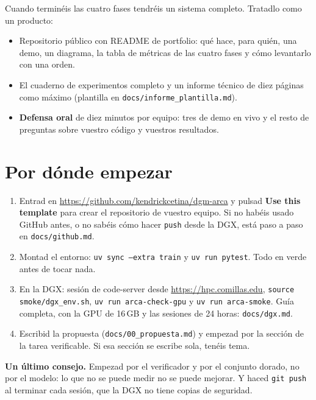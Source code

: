 \documentclass[11pt,a4paper]{article}
\newcommand{\code}[1]{{\small\texttt{#1}}}
\newcommand{\file}[1]{{\small\texttt{\textcolor{arcablue}{#1}}}}
\begin{document}
Cuando terminéis las cuatro fases tendréis un sistema completo. Tratadlo como un producto:

\begin{itemize}
  \item Repositorio público con README de portfolio: qué hace, para quién, una demo, un
  diagrama, la tabla de métricas de las cuatro fases y cómo levantarlo con una orden.
  \item El cuaderno de experimentos completo y un informe técnico de diez páginas como máximo
  (plantilla en \file{docs/informe\_plantilla.md}).
  \item \textbf{Defensa oral} de diez minutos por equipo: tres de demo en vivo y el resto de
  preguntas sobre vuestro código y vuestros resultados.
\end{itemize}

\section{Por dónde empezar}

\begin{enumerate}
  \item Entrad en \url{https://github.com/kendrickcetina/dgm-arca} y pulsad
  \textbf{Use this template} para crear el repositorio de vuestro equipo. Si no habéis usado
  GitHub antes, o no sabéis cómo hacer \code{push} desde la DGX, está paso a paso en
  \file{docs/github.md}.
  \item Montad el entorno: \code{uv sync --extra train} y \code{uv run pytest}. Todo en verde
  antes de tocar nada.
  \item En la DGX: sesión de code-server desde \url{https://hpc.comillas.edu},
  \code{source smoke/dgx\_env.sh}, \code{uv run arca-check-gpu} y \code{uv run arca-smoke}.
  Guía completa, con la GPU de 16\,GB y las sesiones de 24 horas: \file{docs/dgx.md}.
  \item Escribid la propuesta (\file{docs/00\_propuesta.md}) y empezad por la sección de la
  tarea verificable. Si esa sección se escribe sola, tenéis tema.
\end{enumerate}

\textbf{Un último consejo.} Empezad por el verificador y por el conjunto dorado, no por el
modelo: lo que no se puede medir no se puede mejorar. Y haced \code{git push} al terminar cada
sesión, que la DGX no tiene copias de seguridad.
\end{document}
